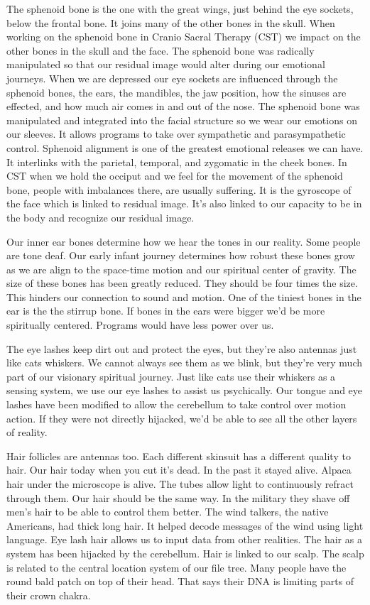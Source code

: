 The sphenoid bone is the one with the great wings, just behind the eye
sockets, below the frontal bone. It joins many of the other bones in the
skull. When working on the sphenoid bone in Cranio Sacral Therapy (CST)
we impact on the other bones in the skull and the face. The sphenoid
bone was radically manipulated so that our residual image would alter
during our emotional journeys. When we are depressed our eye sockets are
influenced through the sphenoid bones, the ears, the mandibles, the jaw
position, how the sinuses are effected, and how much air comes in and
out of the nose. The sphenoid bone was manipulated and integrated into
the facial structure so we wear our emotions on our sleeves. It allows
programs to take over sympathetic and parasympathetic control. Sphenoid
alignment is one of the greatest emotional releases we can have. It
interlinks with the parietal, temporal, and zygomatic in the cheek
bones. In CST when we hold the occiput and we feel for the movement of
the sphenoid bone, people with imbalances there, are usually suffering.
It is the gyroscope of the face which is linked to residual image. It's
also linked to our capacity to be in the body and recognize our residual
image.

Our inner ear bones determine how we hear the tones in our reality. Some
people are tone deaf. Our early infant journey determines how robust
these bones grow as we are align to the space-time motion and our
spiritual center of gravity. The size of these bones has been greatly
reduced. They should be four times the size. This hinders our connection
to sound and motion. One of the tiniest bones in the ear is the the
stirrup bone. If bones in the ears were bigger we'd be more spiritually
centered. Programs would have less power over us.

The eye lashes keep dirt out and protect the eyes, but they're also
antennas just like cats whiskers. We cannot always see them as we blink,
but they're very much part of our visionary spiritual journey. Just like
cats use their whiskers as a sensing system, we use our eye lashes to
assist us psychically. Our tongue and eye lashes have been modified to
allow the cerebellum to take control over motion action. If they were
not directly hijacked, we'd be able to see all the other layers of
reality.

Hair follicles are antennas too. Each different skinsuit has a different
quality to hair. Our hair today when you cut it's dead. In the past it
stayed alive. Alpaca hair under the microscope is alive. The tubes allow
light to continuously refract through them. Our hair should be the same
way. In the military they shave off men's hair to be able to control
them better. The wind talkers, the native Americans, had thick long
hair. It helped decode messages of the wind using light language. Eye
lash hair allows us to input data from other realities. The hair as a
system has been hijacked by the cerebellum. Hair is linked to our scalp.
The scalp is related to the central location system of our file tree.
Many people have the round bald patch on top of their head. That says
their DNA is limiting parts of their crown chakra.

